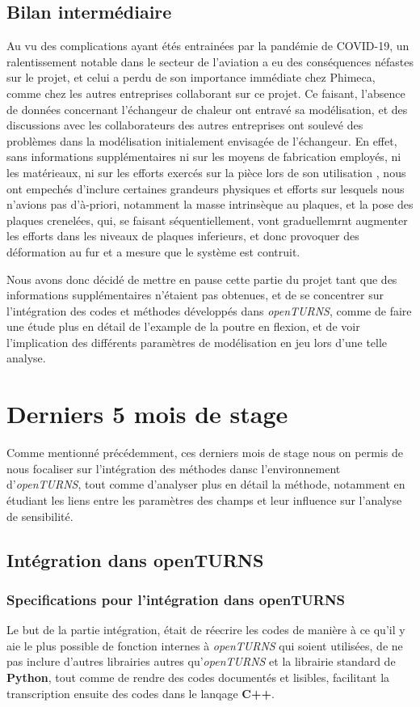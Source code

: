 \documentclass[a4paper,10pt]{article}
\begin{document}
\subsection{Bilan intermédiaire}

Au vu des complications ayant étés entrainées par la pandémie de COVID-19, un ralentissement notable dans le secteur de l'aviation a eu des conséquences néfastes sur le projet, et celui a perdu de son importance immédiate chez Phimeca, comme chez les autres entreprises collaborant sur ce projet. 
Ce faisant, l'absence de données concernant l'échangeur de chaleur ont entravé sa modélisation, et des discussions avec les collaborateurs des autres entreprises ont soulevé des problèmes dans la modélisation initialement envisagée de l'échangeur. En effet, sans informations supplémentaires ni sur les moyens de fabrication employés, ni les matérieaux, ni sur les efforts exercés sur la pièce lors de son utilisation , nous ont empechés d'inclure certaines grandeurs physiques et efforts sur lesquels nous n'avions pas d'à-priori, notamment la masse intrinsèque au plaques, et la pose des plaques crenelées, qui, se faisant séquentiellement, vont graduellemrnt augmenter les efforts dans les niveaux de plaques inferieurs, et donc provoquer des déformation au fur et a mesure que le système est contruit. 

Nous avons donc décidé de mettre en pause cette partie du projet tant que des informations supplémentaires n'étaient pas obtenues, et de se concentrer sur l'intégration des codes et méthodes développés dans \textit{openTURNS}, comme de faire une étude plus en détail de l'example de la poutre en flexion, et de voir l'implication des différents paramètres de modélisation en jeu lors d'une telle analyse. 

\section{Derniers 5 mois de stage }
Comme mentionné précédemment, ces derniers mois de stage nous on permis de nous focaliser sur l'intégration des méthodes dansc l'environnement d'\textit{openTURNS}, tout comme d'analyser plus en détail la méthode, notamment en étudiant les liens entre les paramètres des champs et leur influence sur l'analyse de sensibilité.

\subsection{Intégration dans openTURNS}
\subsubsection{Specifications pour l'intégration dans openTURNS}
Le but de la partie intégration, était de réecrire les codes de manière à ce qu'il y aie le plus possible de fonction internes à \textit{openTURNS} qui soient utilisées, de ne pas inclure d'autres librairies autres qu'\textit{openTURNS} et la librairie standard de \textbf{Python}, tout comme de rendre des codes documentés et lisibles, facilitant la transcription ensuite des codes dans le lanqage \textbf{C++}.
\end{document}
